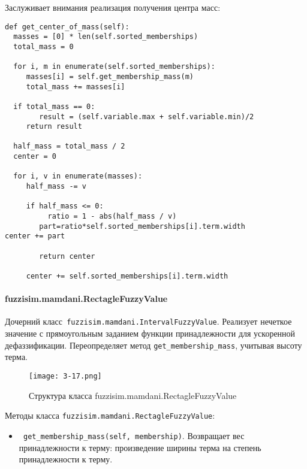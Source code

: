 Заслуживает внимания реализация получения центра масс:
\begin{lstlisting}[style=pythonstyle,caption={  }, label=lst:func:1]
def get_center_of_mass(self):
  masses = [0] * len(self.sorted_memberships)
  total_mass = 0

  for i, m in enumerate(self.sorted_memberships):
     masses[i] = self.get_membership_mass(m)
     total_mass += masses[i]

  if total_mass == 0:
		result = (self.variable.max + self.variable.min)/2
     return result

  half_mass = total_mass / 2
  center = 0

  for i, v in enumerate(masses):
     half_mass -= v

     if half_mass <= 0:
          ratio = 1 - abs(half_mass / v)
  		part=ratio*self.sorted_memberships[i].term.width
center += part

        return center

     center += self.sorted_memberships[i].term.width
\end{lstlisting}








\paragraph{fuzzisim.mamdani.RectagleFuzzyValue}

Дочерний класс\lstinline! fuzzisim.mamdani.IntervalFuzzyValue!. Реализует нечеткое значение с прямоугольным заданием функции принадлежности для ускоренной дефаззификации. Переопределяет метод \lstinline!get_membership_mass!, учитывая высоту терма.

\begin{figure}[ht]
	\centering
	\texttt{[image: 3-17.png]}
	\caption{ Структура класса fuzzisim.mamdani.RectagleFuzzyValue}
\end{figure}


Методы класса \lstinline!fuzzisim.mamdani.RectagleFuzzyValue!:
\begin{itemize}
	\item \lstinline! get_membership_mass(self, membership)!. Возвращает вес принадлежности к терму: произведение ширины терма на степень принадлежности к терму.
\end{itemize}







